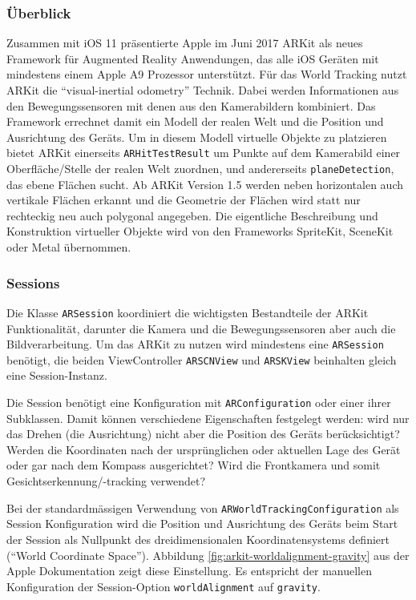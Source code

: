 \subsubsection{Überblick}
Zusammen mit iOS 11 präsentierte Apple im Juni 2017 ARKit als neues Framework für Augmented Reality Anwendungen, das alle iOS Geräten mit mindestens einem Apple A9 Prozessor unterstützt. Für das World Tracking nutzt ARKit die "`visual-inertial odometry"' Technik. Dabei werden Informationen aus den Bewegungssensoren mit denen aus den Kamerabildern kombiniert. Das Framework errechnet damit ein Modell der realen Welt und die Position und Ausrichtung des Geräts. Um in diesem Modell virtuelle Objekte zu platzieren bietet ARKit einerseits \texttt{ARHitTestResult} um Punkte auf dem Kamerabild einer Oberfläche/Stelle der realen Welt zuordnen, und andererseits \texttt{planeDetection}, das ebene Flächen sucht. Ab ARKit Version 1.5 werden neben horizontalen auch vertikale Flächen erkannt und die Geometrie der Flächen wird statt nur rechteckig neu auch polygonal angegeben. Die eigentliche Beschreibung und Konstruktion virtueller Objekte wird von den Frameworks SpriteKit, SceneKit oder Metal übernommen.

\subsubsection{Sessions}
Die Klasse \texttt{ARSession} koordiniert die wichtigsten Bestandteile der ARKit Funktionalität, darunter die Kamera und die Bewegungssensoren aber auch die Bildverarbeitung. Um das ARKit zu nutzen wird mindestens eine \texttt{ARSession} benötigt, die beiden ViewController \texttt{ARSCNView} und \texttt{ARSKView} beinhalten gleich eine Session-Instanz.

Die Session benötigt eine Konfiguration mit \texttt{ARConfiguration} oder einer ihrer Subklassen. Damit können verschiedene Eigenschaften festgelegt werden: wird nur das Drehen (die Ausrichtung) nicht aber die Position des Geräts berücksichtigt? Werden die Koordinaten nach der ursprünglichen oder aktuellen Lage des Gerät oder gar nach dem Kompass ausgerichtet? Wird die Frontkamera und somit Gesichtserkennung/-tracking verwendet?

Bei der standardmässigen Verwendung von \texttt{ARWorldTrackingConfiguration} als Session Konfiguration wird die Position und Ausrichtung des Geräts beim Start der Session als Nullpunkt des dreidimensionalen Koordinatensystems definiert ("`World Coordinate Space"'). Abbildung \ref{fig:arkit-worldalignment-gravity} aus der Apple Dokumentation zeigt diese Einstellung. Es entspricht der manuellen Konfiguration der Session-Option \texttt{worldAlignment} auf \texttt{gravity}.

